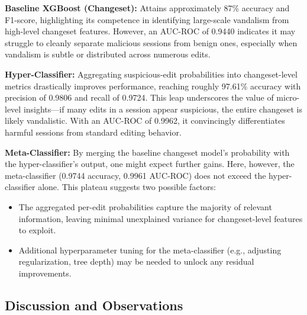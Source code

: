 \documentclass[
    13pt, %
    a4paper, %
    DIV14, %
    listof=totoc, %
    bibliography=totoc, %
    index=totoc, %
    headsepline
]{scrreprt}
\begin{document}
\noindent
\textbf{Baseline XGBoost (Changeset):}
Attains approximately 87\% accuracy and F1-score, highlighting its competence in identifying large-scale vandalism from high-level changeset features. However, an AUC-ROC of 0.9440 indicates it may struggle to cleanly separate malicious sessions from benign ones, especially when vandalism is subtle or distributed across numerous edits.

\noindent
\textbf{Hyper-Classifier:}
Aggregating suspicious-edit probabilities into changeset-level metrics drastically improves performance, reaching roughly 97.61\% accuracy with precision of 0.9806 and recall of 0.9724. This leap underscores the value of micro-level insights—if many edits in a session appear suspicious, the entire changeset is likely vandalistic. With an AUC-ROC of 0.9962, it convincingly differentiates harmful sessions from standard editing behavior.

\noindent
\textbf{Meta-Classifier:}
By merging the baseline changeset model’s probability with the hyper-classifier’s output, one might expect further gains. Here, however, the meta-classifier (0.9744 accuracy, 0.9961 AUC-ROC) does not exceed the hyper-classifier alone. This plateau suggests two possible factors:
\begin{itemize}
    \item The aggregated per-edit probabilities capture the majority of relevant information, leaving minimal unexplained variance for changeset-level features to exploit.
    \item Additional hyperparameter tuning for the meta-classifier (e.g., adjusting regularization, tree depth) may be needed to unlock any residual improvements.
\end{itemize}

\subsection{Discussion and Observations}
\end{document}
